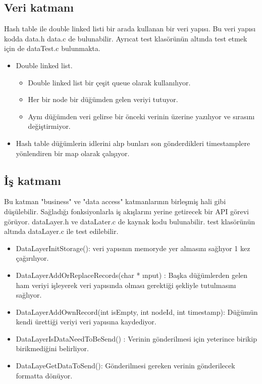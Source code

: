 \documentclass{article}
\begin{document}
\subsection{Veri katmanı}
Hash table ile double linked listi bir arada kullanan bir veri yapısı. Bu veri yapısı kodda data.h data.c de bulunabilir. Ayrıcat test klasörünün altında test etmek için de dataTest.c bulunmakta.
\begin{itemize}
\item Double linked list.
\begin{itemize}
\item Double linked list bir çeşit queue olarak kullanılıyor.
\item Her bir node bir düğümden gelen veriyi tutuyor.
\item Aynı düğümden veri gelirse bir önceki verinin üzerine yazılıyor ve sırasını değiştirmiyor.
\end{itemize}
\item Hash table düğümlerin idlerini alıp bunları son gönderdikleri timestamplere yönlendiren bir map olarak çalışıyor.
\end{itemize}
\subsection{İş katmanı}
Bu katman "business" ve "data access" katmanlarının birleşmiş hali gibi düşülebilir. Sağladığı fonksiyonlarla iş akışlarını yerine getirecek bir API görevi görüyor. dataLayer.h ve dataLater.c de kaynak kodu bulunabilir. test klasörünün altında dataLayer.c ile test edilebilir.

\begin{itemize}
\item DataLayerInitStorage(): veri yapısnın memoryde yer almasını sağlıyor 1 kez çağırılıyor.
\item DataLayerAddOrReplaceRecords(char * ınput) : Başka düğümlerden gelen ham veriyi işleyerek veri yapısında olması gerektiği şekliyle tutulmasını sağlıyor.
\item DataLayerAddOwnRecord(int isEmpty, int nodeId, int timestamp):   Düğümün kendi ürettiği veriyi veri yapısına kaydediyor.
\item DataLayerIsDataNeedToBeSend() : Verinin gönderilmesi için yeterince birikip birikmediğini belirliyor.
\item DataLayeGetDataToSend(): Gönderilmesi gereken verinin gönderilecek formatta dönüyor.

\end{itemize}
\end{document}
